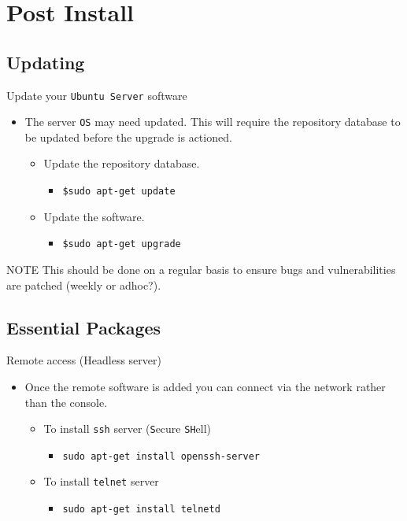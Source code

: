 \documentclass[aspectratio=169]{beamer}
\begin{document}
\section{Post Install}
\subsection{Updating}
\begin{frame}{Update your \texttt{Ubuntu Server} software}
  \begin{itemize}
    \item The server \texttt{OS} may need updated. This will require the repository database to be updated before the upgrade is actioned.
      \begin{itemize}
        \item Update the repository database.
          \begin{itemize}
            \item \texttt{\$sudo apt-get update}
          \end{itemize}
        \item Update the software.
          \begin{itemize}
            \item \texttt{\$sudo apt-get upgrade}
          \end{itemize}
      \end{itemize}
  \end{itemize}
  \begin{block}{NOTE}
    This should be done on a regular basis to ensure bugs and vulnerabilities are patched (weekly or adhoc?). 
  \end{block}
\end{frame}

\subsection{Essential Packages}
\begin{frame}{Remote access (Headless server)}
  \begin{itemize}
    \item Once the remote software is added you can connect via the network rather than the console.
      \begin{itemize}
        \item To install \texttt{ssh} server (\texttt{S}ecure \texttt{SH}ell)
          \begin{itemize}
            \item \texttt{sudo apt-get install openssh-server}
          \end{itemize}
        \item To install \texttt{telnet} server
          \begin{itemize}
            \item \texttt{sudo apt-get install telnetd}
          \end{itemize}
      \end{itemize}
  \end{itemize}
\end{frame}
\end{document}

